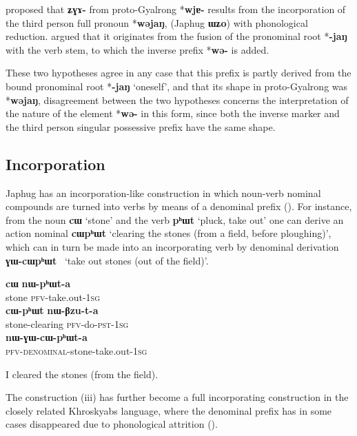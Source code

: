 \documentclass[oldfontcommands,oneside,a4paper,11pt]{article}
\newcommand{\ipa}[1]{\mbox{\phon\textbf{#1}}} %
\begin{document}
\citet{jacques10refl} proposed that \ipa{ʑɣɤ-} from proto-Gyalrong *\ipa{wjɐ-} results from the incorporation of the third person full pronoun *\ipa{wəjaŋ}, (Japhug \ipa{ɯʑo}) with phonological reduction. \citet{jackson14morpho} argued that it originates from the fusion of the pronominal root *\ipa{-jaŋ} with the verb stem, to which the inverse prefix *\ipa{wə-} is added.

These two hypotheses agree in any case that this prefix is partly derived from the bound pronominal root *\ipa{-jaŋ} `oneself', and that its shape in proto-Gyalrong was *\ipa{wəjaŋ}, disagreement between the two hypotheses concerns the interpretation of the nature of the element *\ipa{wə-} in this form, since both the inverse marker and the third person singular possessive prefix have the same shape.

\subsection{Incorporation} \label{sec:incorp}
Japhug has an incorporation-like construction in which noun-verb nominal compounds are turned into verbs by means of a denominal prefix (\citealt{jacques12incorp}). For instance, from the noun \ipa{cɯ} `stone' and the verb \ipa{pʰɯt} `pluck, take out' one can derive an action nominal   \ipa{cɯpʰɯt} `clearing the stones (from a field, before ploughing)', which can in turn be made into an incorporating verb by denominal derivation  \ipa{ɣɯ-cɯpʰɯt } `take out stones (out of the field)'. 

\begin{exe}   
\ex
\begin{xlist}[(ii)]
\gll     \ipa{cɯ} \ipa{nɯ-pʰɯt-a}  \\
  stone \textsc{pfv}-take.out-\textsc{1sg} \\
\gll     \ipa{cɯ-pʰɯt} \ipa{nɯ-βzu-t-a}  \\
  stone-clearing \textsc{pfv}-do-\textsc{pst}-\textsc{1sg} \\
\gll     \ipa{nɯ-ɣɯ-cɯ-pʰɯt-a}  \\
  \textsc{pfv-denominal}-stone-take.out-\textsc{1sg} \\
  \end{xlist}
  \glt   I cleared the stones (from the field). 
\end{exe}   

The construction (iii) has further become a full incorporating construction in the closely related Khroskyabs language, where the denominal prefix has in some cases disappeared due to phonological attrition (\citealt{lai13affixale}).
\end{document}

